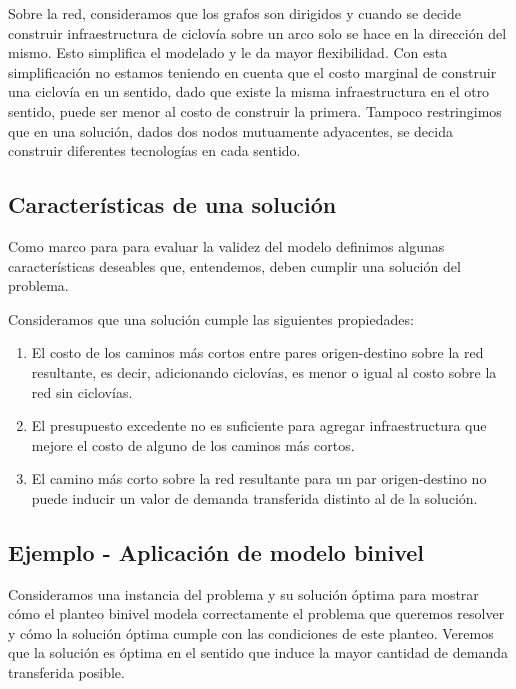 \documentclass{article}
\begin{document}
  Sobre la red, consideramos que los grafos son dirigidos y cuando se decide construir infraestructura de ciclovía sobre un arco solo se hace en la dirección del mismo. Esto simplifica el modelado y le da mayor flexibilidad. Con esta simplificación no estamos teniendo en cuenta que el costo marginal de construir una ciclovía en un sentido, dado que existe la misma infraestructura en el otro sentido, puede ser menor al costo de construir la primera. Tampoco restringimos que en una solución, dados dos nodos mutuamente adyacentes, se decida construir diferentes tecnologías en cada sentido.

  \subsection{Características de una solución}
  \label{sect:solutioncharacteristics}

  Como marco para para evaluar la validez del modelo definimos algunas características deseables que, entendemos, deben cumplir una solución del problema.

  Consideramos que una solución cumple las siguientes propiedades:

  \begin{enumerate}
      \item{El costo de los caminos más cortos entre pares origen-destino sobre la red resultante, es decir, adicionando ciclovías, es menor o igual al costo sobre la red sin ciclovías.}
    \item{\label{budgetexcess} El presupuesto excedente no es suficiente para agregar infraestructura que mejore el costo de alguno de los caminos más cortos.}
    \item{El camino más corto sobre la red resultante para un par origen-destino no puede inducir un valor de demanda transferida distinto al de la solución.}
  \end{enumerate}

  \subsection{Ejemplo - Aplicación de modelo binivel}
  \label{sect:example1}

  Consideramos una instancia del problema y su solución óptima para mostrar cómo el planteo binivel modela correctamente el problema que queremos resolver y cómo la solución óptima cumple con las condiciones de este planteo. Veremos que la solución es óptima en el sentido que induce la mayor cantidad de demanda transferida posible.
\end{document}
